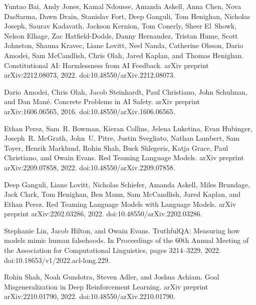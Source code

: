 \documentclass[11pt]{article}
\begin{document}
\begin{thebibliography}{99}
Yuntao Bai, Andy Jones, Kamal Ndousse, Amanda Askell, Anna Chen, Nova DasSarma, Dawn Drain, Stanislav Fort, Deep Ganguli, Tom Henighan, Nicholas Joseph, Saurav Kadavath, Jackson Kernion, Tom Conerly, Sheer El~Showk, Nelson Elhage, Zac Hatfield-Dodds, Danny Hernandez, Tristan Hume, Scott Johnston, Shauna Kravec, Liane Lovitt, Neel Nanda, Catherine Olsson, Dario Amodei, Sam McCandlish, Chris Olah, Jared Kaplan, and Thomas Henighan.
\newblock Constitutional AI: Harmlessness from AI Feedback.
\newblock arXiv preprint arXiv:2212.08073, 2022.
\newblock doi:10.48550/arXiv.2212.08073.

Dario Amodei, Chris Olah, Jacob Steinhardt, Paul Christiano, John Schulman, and Dan Man{\'e}.
\newblock Concrete Problems in AI Safety.
\newblock arXiv preprint arXiv:1606.06565, 2016.
\newblock doi:10.48550/arXiv.1606.06565.

Ethan Perez, Sam~R. Bowman, Kieran Collins, Jelena Luketina, Evan Hubinger, Joseph~R. McGrath, John~U. Pitre, Justin Svegliato, Nathan Lambert, Sam Toyer, Henrik Marklund, Rohin Shah, Buck Shlegeris, Katja Grace, Paul Christiano, and Owain Evans.
\newblock Red Teaming Language Models.
\newblock arXiv preprint arXiv:2209.07858, 2022.
\newblock doi:10.48550/arXiv.2209.07858.

Deep Ganguli, Liane Lovitt, Nicholas Schiefer, Amanda Askell, Miles Brundage, Jack Clark, Tom Henighan, Ben Mann, Sam McCandlish, Jared Kaplan, and Ethan Perez.
\newblock Red Teaming Language Models with Language Models.
\newblock arXiv preprint arXiv:2202.03286, 2022.
\newblock doi:10.48550/arXiv.2202.03286.

Stephanie Lin, Jacob Hilton, and Owain Evans.
\newblock TruthfulQA: Measuring how models mimic human falsehoods.
\newblock In Proceedings of the 60th Annual Meeting of the Association for Computational Linguistics, pages 3214--3229, 2022.
\newblock doi:10.18653/v1/2022.acl-long.229.

Rohin Shah, Noah Gundotra, Steven Adler, and Joshua Achiam.
\newblock Goal Misgeneralization in Deep Reinforcement Learning.
\newblock arXiv preprint arXiv:2210.01790, 2022.
\newblock doi:10.48550/arXiv.2210.01790.


\end{thebibliography}
\end{document}

